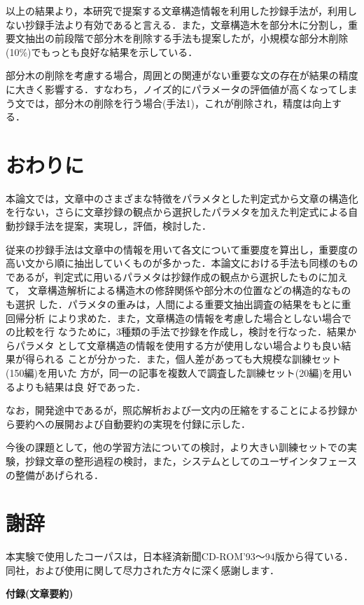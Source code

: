 以上の結果より，本研究で提案する文章構造情報を利用した抄録手法が，利用し
ない抄録手法より有効であると言える．また，文章構造木を部分木に分割し，重
要文抽出の前段階で部分木を削除する手法も提案したが，小規模な部分木削除
(10\%)でもっとも良好な結果を示している．

部分木の削除を考慮する場合，周囲との関連がない重要な文の存在が結果の精度
に大きく影響する．すなわち，ノイズ的にパラメータの評価値が高くなってしま
う文では，部分木の削除を行う場合(手法1)，これが削除され，精度は向上する．


\section{おわりに}\label{conclusion}

本論文では，文章中のさまざまな特徴をパラメタとした判定式から文章の構造化
を行ない，さらに文章抄録の観点から選択したパラメタを加えた判定式による自
動抄録手法を提案，実現し，評価，検討した．

従来の抄録手法は文章中の情報を用いて各文について重要度を算出し，重要度の
高い文から順に抽出していくものが多かった．本論文における手法も同様のもの
であるが，判定式に用いるパラメタは抄録作成の観点から選択したものに加えて，
文章構造解析による構造木の修辞関係や部分木の位置などの構造的なものも選択
した．パラメタの重みは，人間による重要文抽出調査の結果をもとに重回帰分析
により求めた．また，文章構造の情報を考慮した場合としない場合での比較を行
なうために，3種類の手法で抄録を作成し，検討を行なった．結果からパラメタ
として文章構造の情報を使用する方が使用しない場合よりも良い結果が得られる
ことが分かった．また，個人差があっても大規模な訓練セット(150編)を用いた
方が，同一の記事を複数人で調査した訓練セット(20編)を用いるよりも結果は良
好であった．

なお，開発途中であるが，照応解析および一文内の圧縮をすることによる抄録か 
ら要約への展開および自動要約の実現を付録に示した．

今後の課題として，他の学習方法についての検討，より大きい訓練セットでの実
験，抄録文章の整形過程の検討，また，システムとしてのユーザインタフェース
の整備があげられる．

\section*{謝辞}

本実験で使用したコーパスは，日本経済新聞CD-ROM'93〜94版から得ている．
同社，および使用に関して尽力された方々に深く感謝します．


\newpage
{\large \bf 付録(文章要約)}

